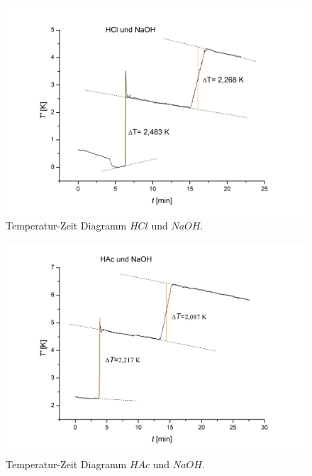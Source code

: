 \documentclass[12pt,a4paper,titlepage,headinclude,bibtotoc]{scrartcl}
\begin{document}
\begin{figure}[h] \label{HClundNaOH}
\centering
\includegraphics[width=13.5cm]{HClundNaOH.png}
\caption{Temperatur-Zeit Diagramm $HCl$ und $NaOH$.}
\end{figure} 
\FloatBarrier


\begin{figure}[h] \label{HAcundNaOH}
\centering
\includegraphics[width=13.5cm]{HAcundNaOH.png}
\caption{Temperatur-Zeit Diagramm $HAc$ und $NaOH$.}
\end{figure} 
\FloatBarrier
\end{document}
